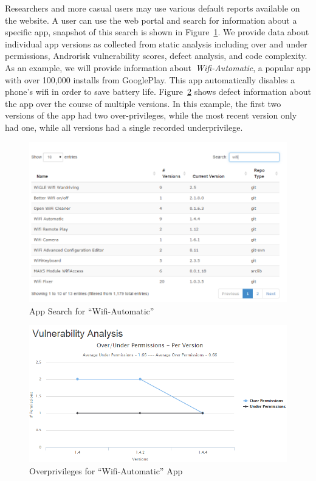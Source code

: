 \documentclass[journal,transmag]{IEEEtran}
\begin{document}

Researchers and more casual users may use various default reports available on the website. A user can use the web portal and  search  for information about a specific app, snapshot of this search is shown in Figure~\ref{fig:appsearch}. We provide data about individual app versions as collected from static analysis including over and under permissions, Androrisk vulnerability scores, defect analysis, and code complexity. As an example, we will provide information about~\emph{Wifi-Automatic}\cite{wifi_automatic_GH}, a popular app with over 100,000 installs from GooglePlay. This app automatically disables a phone's wifi in order to save battery life. Figure~\ref{fig:specificAppInfo} shows defect information about the app over the course of multiple versions. In this example, the first two versions of the app had two over-privileges, while the most recent version only had one, while all versions had a single recorded underprivilege.




\begin{figure}[ht!]
\centering
\includegraphics[width=\columnwidth, angle = 0]{images/wifi-automatic_app_search.png}
\caption{App Search for ``Wifi-Automatic'' }
\label{fig:appsearch}
\end{figure}

\begin{figure}[ht!]
\centering
\includegraphics[width=\columnwidth, angle = 0]{images/wifi-automatic-oprivs.png}
\caption{Overprivileges for ``Wifi-Automatic'' App}
\label{fig:specificAppInfo}
\end{figure}
\end{document}
